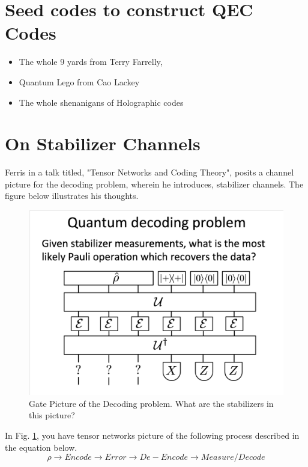 \documentclass[%
 reprint,
amsmath,amssymb,
aps,
onecolumn,
]{revtex4-2}
\begin{document}
\section{Seed codes to construct QEC Codes}
\begin{itemize}
    \item The whole 9 yards from Terry Farrelly,
    \item Quantum Lego from Cao Lackey
    \item The whole shenanigans of Holographic codes
\end{itemize}


\section{On Stabilizer Channels}
Ferris in a talk titled, "Tensor Networks and Coding Theory", posits a channel picture for the decoding problem, wherein he introduces, stabilizer channels. The figure below illustrates his thoughts.

\begin{figure}[ht]
    \centering
    \includegraphics[scale=0.3]{../assets/decoding_gate_picture.png}
    \caption{Gate Picture of the Decoding problem. \textcolor{BrickRed}{What are the stabilizers in this picture?}}
    \label{fig:decode-gate-picture}
\end{figure}

In Fig. \ref{fig:decode-gate-picture}, you have tensor networks picture of the following process described in the equation below.
\begin{equation*}
    \rho \rightarrow Encode \rightarrow Error \rightarrow De-Encode \rightarrow Measure/Decode
\end{equation*}
\end{document}
